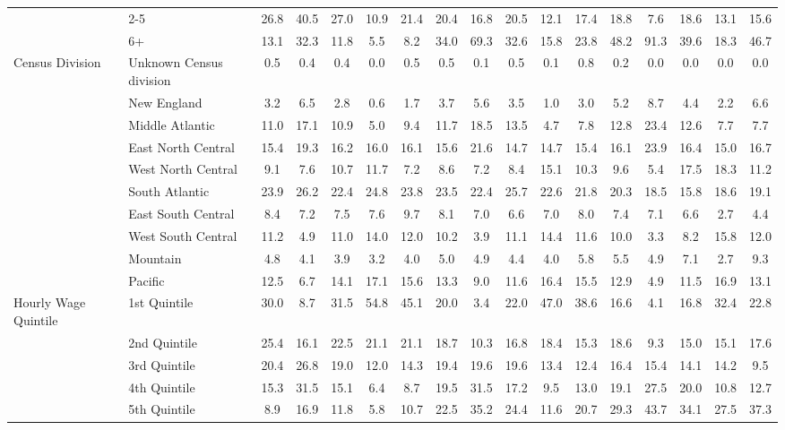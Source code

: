 \begin{tabular}{llccccc|ccccc|ccccc}
&2-5&26.8&40.5&27.0&10.9&21.4&20.4&16.8&20.5&12.1&17.4&18.8&7.6&18.6&13.1&15.6\\
&6+&13.1&32.3&11.8&5.5&8.2&34.0&69.3&32.6&15.8&23.8&48.2&91.3&39.6&18.3&46.7\\
Census Division&Unknown Census division&0.5&0.4&0.4&0.0&0.5&0.5&0.1&0.5&0.1&0.8&0.2&0.0&0.0&0.0&0.0\\
&New England&3.2&6.5&2.8&0.6&1.7&3.7&5.6&3.5&1.0&3.0&5.2&8.7&4.4&2.2&6.6\\
&Middle Atlantic&11.0&17.1&10.9&5.0&9.4&11.7&18.5&13.5&4.7&7.8&12.8&23.4&12.6&7.7&7.7\\
&East North Central&15.4&19.3&16.2&16.0&16.1&15.6&21.6&14.7&14.7&15.4&16.1&23.9&16.4&15.0&16.7\\
&West North Central&9.1&7.6&10.7&11.7&7.2&8.6&7.2&8.4&15.1&10.3&9.6&5.4&17.5&18.3&11.2\\
&South Atlantic&23.9&26.2&22.4&24.8&23.8&23.5&22.4&25.7&22.6&21.8&20.3&18.5&15.8&18.6&19.1\\
&East South Central&8.4&7.2&7.5&7.6&9.7&8.1&7.0&6.6&7.0&8.0&7.4&7.1&6.6&2.7&4.4\\
&West South Central&11.2&4.9&11.0&14.0&12.0&10.2&3.9&11.1&14.4&11.6&10.0&3.3&8.2&15.8&12.0\\
&Mountain&4.8&4.1&3.9&3.2&4.0&5.0&4.9&4.4&4.0&5.8&5.5&4.9&7.1&2.7&9.3\\
&Pacific&12.5&6.7&14.1&17.1&15.6&13.3&9.0&11.6&16.4&15.5&12.9&4.9&11.5&16.9&13.1\\
Hourly Wage Quintile&1st Quintile&30.0&8.7&31.5&54.8&45.1&20.0&3.4&22.0&47.0&38.6&16.6&4.1&16.8&32.4&22.8\\
&2nd Quintile&25.4&16.1&22.5&21.1&21.1&18.7&10.3&16.8&18.4&15.3&18.6&9.3&15.0&15.1&17.6\\
&3rd Quintile&20.4&26.8&19.0&12.0&14.3&19.4&19.6&19.6&13.4&12.4&16.4&15.4&14.1&14.2&9.5\\
&4th Quintile&15.3&31.5&15.1&6.4&8.7&19.5&31.5&17.2&9.5&13.0&19.1&27.5&20.0&10.8&12.7\\
&5th Quintile&8.9&16.9&11.8&5.8&10.7&22.5&35.2&24.4&11.6&20.7&29.3&43.7&34.1&27.5&37.3\\
\hline\hline
\end{tabular}
